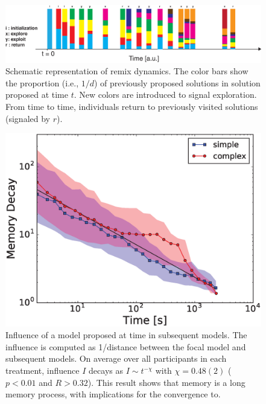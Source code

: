 \begin{figure}[h!]
\begin{center}
\includegraphics[width=16cm]{figures/schematic_remix.eps}
\caption{Schematic representation of remix dynamics. The color bars show the proportion (i.e., $1/d$) of previously proposed solutions in solution proposed at time $t$. New colors are introduced 	to signal exploration. From time to time, individuals return to previously visited solutions (signaled by $r$).}
\label{fig:schematic_remix}
\end{center}
\end{figure}


\begin{figure}[h!]
\begin{center}
\includegraphics[width=13cm]{figures/MemoryDecay.eps}
\caption{Influence of a model proposed at time in subsequent models. The influence is computed as 1/distance between the focal model and subsequent models. On average over all participants in each treatment, influence $I$ decays as $I \sim t^{-\chi}$ with $\chi = 0.48(2)$ ($p < 0.01$ and $R > 0.32$). This result shows that memory is a long memory process, with implications for the convergence to.}
\label{fig:memory}
\end{center}
\end{figure}



